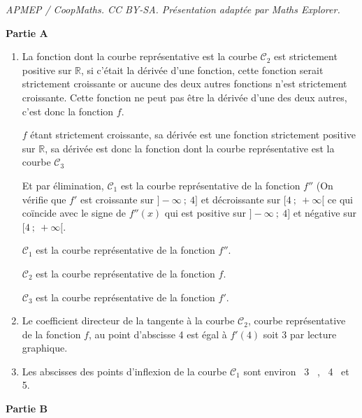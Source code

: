 \documentclass[10pt]{article}
\providecommand{\R}{\mathbb{R}}
\begin{document}
\noindent\textit{APMEP / CoopMaths. CC BY-SA. Présentation adaptée par Maths Explorer.}\par\medskip
\bigskip

\textbf{Partie A}

\begin{enumerate}

\item La fonction dont la courbe représentative est la courbe $\mathcal{C}_2$ est strictement positive sur $\R$, si c'était la dérivée d'une fonction, cette fonction serait strictement croissante or aucune des deux autres fonctions n'est strictement croissante. Cette fonction ne peut pas être la dérivée d'une des deux autres,  c'est donc la fonction $f$.

$f$ étant strictement croissante, sa dérivée est une fonction strictement positive sur $\R$, sa dérivée est donc la fonction dont la courbe représentative est la courbe $\mathcal{C}_3$

Et par élimination, $\mathcal{C}_1$  est la courbe représentative de la fonction $f''$ 
(On vérifie que $f'$ est croissante sur $]-\infty~;~ 4]$ et  décroissante sur $[4~;~+\infty[$ ce qui coïncide avec le signe de $f''(x)$ qui est positive sur $]-\infty~;~4]$ et négative sur $[4~;~+\infty[$.

$\mathcal{C}_1$  est la courbe représentative de la fonction $f''$.

$\mathcal{C}_2$ est la courbe représentative de la fonction $f$.

$\mathcal{C}_3$ est la courbe représentative de la fonction $f'$.

\item Le coefficient directeur de la  tangente à la courbe $\mathcal{C}_2$, courbe représentative de la fonction $f$, au point d'abscisse 4 est égal à $f'(4)$ soit 3 par lecture graphique.
\item  Les abscisses des points d'inflexion de la courbe $\mathcal{C}_1$ sont  environ \, 3 \, , \, 4 \, et \, 5.
\end{enumerate}

\medskip

\textbf{Partie B}

\medskip
\end{document}
